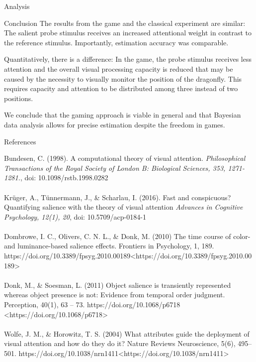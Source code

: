 \documentclass[a0paper,portrait]{baposter}
\begin{document}
\begin{poster}
\begin{posterbox}[name=results,span=1,column=2,row=0]{Analysis}
		\end{posterbox}
		
		\begin{posterbox}[name=conclusion,span=1,column=2,row=2,below=results]{Conclusion}
			The results from the game and the classical experiment are similar: The salient probe stimulus receives an increased attentional weight in contrast to the reference stimulus. Importantly, estimation accuracy was comparable.
			
			Quantitatively, there is a difference: In the game, the probe stimulus receives less attention and the overall visual processing capacity is reduced that may be caused by the necessity to visually monitor the position of the dragonfly. This requires capacity and attention to be distributed among three instead of two positions.
			
			We conclude that the gaming approach is viable in general and that Bayesian data analysis allows for precise estimation despite the freedom in games.
		\end{posterbox}
		
		\begin{posterbox}[name=refs,column=0,span=2,below=procedure,above=bottom]{References}
			\footnotesize
			\linespread{1}
			
			{\color{upbblue}Bundesen, C. } ({\color{upbblue}1998}). A computational theory of visual attention. \textit{Philosophical Transactions of the Royal Society of London B: Biological Sciences, 353, 1271-1281.}, doi: 10.1098/rstb.1998.0282 
			\\\\
			{\color{upbblue}Krüger, A., Tünnermann, J., \& Scharlau, I.} ({\color{upbblue}2016}). Fast and conspicuous? Quantifying salience with the theory of visual attention \textit{Advances in Cognitive Psychology, 12(1), 20}, doi: 10.5709/acp-0184-1
			\\\\
			{\color{upbblue}Dombrowe, I. C., Olivers, C. N. L., \& Donk, M. (2010)} The time course of color- and luminance-based salience effects. Frontiers in Psychology, 1, 189. https://doi.org/10.3389/fpsyg.2010.00189<https://doi.org/10.3389/fpsyg.2010.00189>
			\\\\
			{\color{upbblue}Donk, M., \& Soesman, L. (2011)} Object salience is transiently represented whereas object presence is not: Evidence from temporal order judgment. Perception, 40(1), 63 – 73. https://doi.org/10.1068/p6718 <https://doi.org/10.1068/p6718>
			\\\\
			{\color{upbblue}Wolfe, J. M., \& Horowitz, T. S. (2004)} What attributes guide the deployment of visual attention and how do they do it? Nature Reviews Neuroscience, 5(6), 495–501. https://doi.org/10.1038/nrn1411<https://doi.org/10.1038/nrn1411>
			\vspace{0.115cm}
		\end{posterbox}
		
	\end{poster}
\end{document}
